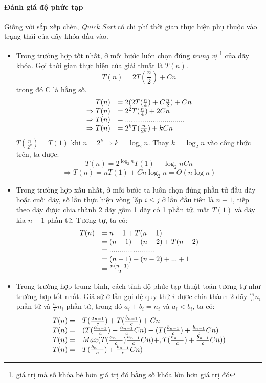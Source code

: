 \documentclass[8pt, a4paper]{article}
\begin{document}
\paragraph{Đánh giá độ phức tạp}
Giống với sắp xếp chèn, \emph{Quick Sort} có chi phí thời gian thực hiện phụ thuộc vào trạng thái của dãy khóa đầu vào.
\begin{itemize}
\item Trong trường hợp tốt nhất, ở mỗi bước luôn chọn đúng \emph{trung vị} \footnote{giá trị mà số khóa bé hơn giá trị đó bằng số khóa lớn hơn giá trị đó} của dãy khóa. Gọi thời gian thực hiện của giải thuật là $T(n)$.
$$T(n) = 2T(\frac{n}{2}) + Cn$$
trong đó C là hằng số.
\begin{displaymath}
\begin{array}{r l}
T(n) &= 2(2T(\frac{n}{4}) + C\frac{n}{2}) + Cn\\
\Rightarrow T(n) &= 2^2 T(\frac{n}{4}) + 2Cn\\
\Rightarrow T(n) &=..............................\\
\Rightarrow T(n) &= 2^k T(\frac{n}{2^k}) + kCn 
\end{array}
\end{displaymath}
$T(\frac{n}{2^k}) = T(1)$ khi $n = 2^k \Rightarrow k = \log_2 n$. Thay $k = \log_2 n$ vào công thức trên, ta được:\\
$$T(n) = 2^{\log_2{n}} T(1) + \log_2{n}Cn$$
$$\Rightarrow  T(n) = n T(1) + Cn\log_2{n} = \Theta(n \log n)$$
\item Trong trường hợp xấu nhất, ở mỗi bước ta luôn chọn đúng phần tử đầu dãy hoặc cuối dãy, số lần thực hiện vòng lặp $i\leq j$ ở lần đầu tiên là $n-1$, tiếp theo dãy được chia thành 2 dãy gồm 1 dãy có 1 phần tử, mất $T(1)$ và dãy kia $n-1$ phần tử. Tương tự, ta có:
\begin{displaymath}
\begin{array}{r l}
T(n) &= n-1 + T(n-1) \\
 &=  (n-1) + (n-2) + T(n-2)\\
 &= .......................\\
 &= (n-1) + (n-2) + ... + 1\\
 &= \frac{n(n-1)}{2}
\end{array}
\end{displaymath}
\item Trong trường hợp trung bình, cách tính độ phức tạp thuật toán tương tự như trường hợp tốt nhất. Giả sử ở lần gọi đệ quy thứ $i$ được chia thành 2 dãy $\frac{a_i}{c} n_i$ phần tử và $\frac{b_i}{c} n_i$ phần tử, trong đó $a_i + b_i = n_i$ và $a_i < b_i$, ta có:
\begin{displaymath}
\begin{array}{r l}
T(n)=& T(\frac{a_{n-1}}{c}) + T(\frac{b_{n-1}}{c}) + C n\\
T(n)=& (T(\frac{a_{n-1}}{c}) + \frac{a_{n-1}}{c}C n) + (T(\frac{b_{n-1}}{c}) + \frac{b_{n-1}}{c}C n)\\
T(n)=& Max(T(\frac{a_{n-1}}{c}) \frac{a_{n-1}}{c}C n)+ ,T(\frac{b_{n-1}}{c}) + \frac{b_{n-1}}{c}C n))\\
T(n)=& T(\frac{b_{n-1}}{c}) + \frac{b_{n-1}}{c}C n)
\end{array}
\end{displaymath}


\end{itemize}
\end{document}

